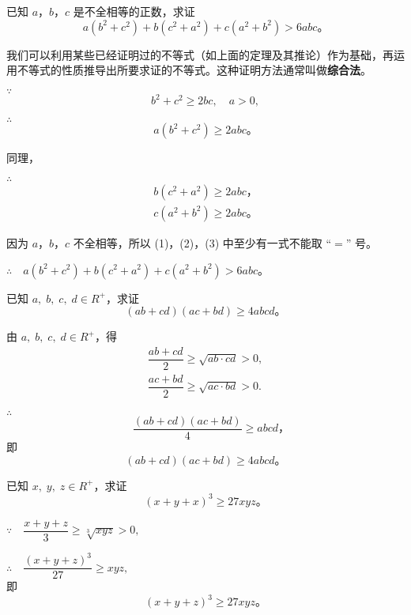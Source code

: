 \liti 已知 $a$，$b$，$c$ 是不全相等的正数，求证
$$ a(b^2 + c^2) + b(c^2 + a^2) + c(a^2 + b^2) > 6abc \text{。} $$

我们可以利用某些已经证明过的不等式（如上面的定理及其推论）作为基础，再运用不等式的性质推导出所要求证的不等式。这种证明方法通常叫做\textbf{综合法}。

\zhengming \; $\because$
\shangyihang $$ b^2 + c^2 \geqslant 2bc,\quad a > 0, $$

$\therefore$
\vspace{-1.5em}\begin{equation}
    a(b^2 + c^2) \geqslant 2abc \text{。} \tag{1}
\end{equation}

同理，

$\therefore$
\vspace{-1.5em}\begin{gather}
    b(c^2 + a^2) \geqslant 2abc \text{，} \tag{2} \\
    c(a^2 + b^2) \geqslant 2abc \text{。} \tag{3}
\end{gather}

因为 $a$，$b$，$c$ 不全相等，所以 (1)，(2)，(3) 中至少有一式不能取 “$=$” 号。

$\therefore \quad a(b^2 + c^2) + b(c^2 + a^2) + c(a^2 + b^2) > 6abc$。


\liti 已知 $a,\; b,\; c,\; d \in R^+$，求证
$$ (ab + cd)(ac + bd) \geqslant 4abcd \text{。} $$

\zhengming 由 $a,\; b,\; c,\; d \in R^+$，得
$$\begin{aligned}
    \dfrac{ab + cd}{2} \geqslant \sqrt{ab \cdot cd} > 0 , \\
    \dfrac{ac + bd}{2} \geqslant \sqrt{ac \cdot bd} > 0 .
\end{aligned}$$

$\therefore$
\vspace{-1.5em}$$\quad \dfrac{(ab + cd)(ac + bd)}{4} \geqslant abcd \text{，}$$
即
$$ (ab + cd)(ac + bd) \geqslant 4abcd \text{。} $$


\liti 已知 $x,\; y,\; z \in R^+$，求证
$$ (x + y + x)^3 \geqslant 27xyz \text{。} $$

\zhengming \; $\because \quad \dfrac{x + y + z}{3} \geqslant \sqrt[3]{xyz} > 0,$

$\therefore \quad \dfrac{(x + y + z)^3}{27} \geqslant xyz , $ \\
即
$$ (x + y + z)^3 \geqslant 27xyz \text{。} $$



